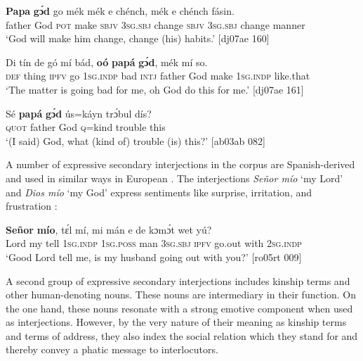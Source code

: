 \ea%
    \label{ex:key:1640}
    \gll \textbf{Papa}  \textbf{gɔ́d}  go  mék    mék  e    chénch,  mék  e    chénch  fásin.\\
father  God  \textsc{pot}  make  \textsc{sbjv}  \textsc{3sg.sbj}  change  \textsc{sbjv}  \textsc{3sg.sbj}  change  manner\\
\glt ‘God will make him change, change (his) habits.’ [dj07ae 160]
\z


\ea%
    \label{ex:key:1641}
    \gll Di  tín    de  gó  mí    bád,    \textbf{oó}  \textbf{papá}  \textbf{gɔ́d},  
mék    mí    so.\\
\textsc{def}  thing  \textsc{ipfv}  go  \textsc{1sg.indp}  bad    \textsc{intj}  father  God  
make  \textsc{1sg.indp}  like.that\\
\glt ‘The matter is going bad for me, oh God do this for me.’ [dj07ae 161]
\z

\ea%
    \label{ex:key:1642}
    \gll Sé    \textbf{papá}  \textbf{gɔ́d}  ús=káyn  trɔ́bul  dís?\\
\textsc{quot}    father  God  \textsc{q}=kind  trouble  this\\

\glt ‘(I said) God, what (kind of) trouble (is) this?’ [ab03ab 082]
\z

A number of expressive secondary interjections in the corpus are Spanish-derived and used in similar ways in European . The interjections \textit{Señor mío} ‘my Lord’ and \textit{Dios mío} ‘my God’ express sentiments like surprise, irritation, and frustration :


\ea%
    \label{ex:key:1643}
    \gll \textbf{Señor}  \textbf{mío},  tɛ́l  mí,    mi    mán
e    de  kɔmɔ́t  wet    yú?\\
Lord  my    tell  \textsc{1sg.indp}  \textsc{1sg.poss}  man
\textsc{3sg.sbj}  \textsc{ipfv}  go.out  with    \textsc{2sg.indp}\\

\glt ‘Good Lord tell me, is my husband going out with you?’ [ro05rt 009]
\z

A second group of expressive secondary interjections includes kinship terms and other human-denoting nouns. These nouns are intermediary in their function. On the one hand, these nouns resonate with a strong emotive component when used as interjections. However, by the very nature of their meaning as kinship terms and terms of address, they also index the social relation which they stand for and thereby convey a phatic message to interlocutors. 


